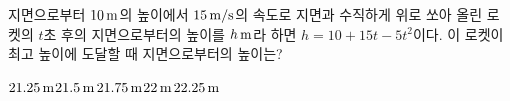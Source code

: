 지면으로부터 $10\mkern3mu \mathrm{m}$의 높이에서 $15\mkern3mu \mathrm{m/s}$의 속도로 지면과 수직하게 위로 쏘아 올린 로켓의 $t$초 후의 지면으로부터의 높이를 $h\mkern3mu \mathrm{m}$라 하면 $h=10+15t-5t^2$이다. 이 로켓이 최고 높이에 도달할 때 지면으로부터의 높이는?
\begin{choices32}{$21.25\mkern3mu \mathrm{m}$}{$21.5\mkern3mu \mathrm{m}$}{$21.75\mkern3mu \mathrm{m}$}{$22\mkern3mu \mathrm{m}$}{$22.25\mkern3mu \mathrm{m}$}\end{choices32}
